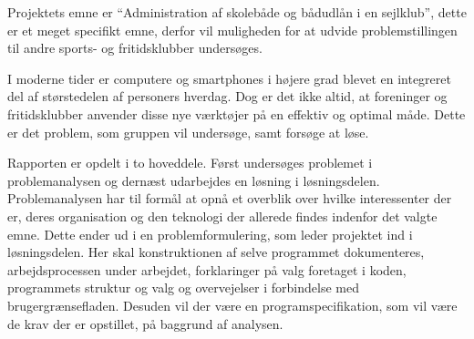 Projektets emne er ``Administration af skolebåde og bådudlån i en sejlklub'', dette er et meget specifikt
emne, derfor vil  muligheden for at udvide problemstillingen til andre sports- og fritidsklubber undersøges.

I moderne tider er computere og smartphones i højere grad blevet en integreret del af størstedelen af
personers hverdag. \citep{dstSPogPC} Dog er det ikke altid, at foreninger og fritidsklubber anvender disse nye
værktøjer på en effektiv og optimal måde. Dette er det problem, som gruppen vil undersøge, samt forsøge at løse.

Rapporten er opdelt i to hoveddele. Først undersøges problemet i problemanalysen og dernæst udarbejdes en
løsning i løsningsdelen. Problemanalysen har til formål at opnå et overblik over hvilke interessenter der er,
deres organisation og den teknologi der allerede findes indenfor det valgte emne. Dette ender ud i en problemformulering, som leder
projektet ind i løsningsdelen. Her skal konstruktionen af selve programmet dokumenteres, arbejdsprocessen under arbejdet, forklaringer på valg foretaget i koden, programmets struktur og valg og overvejelser i forbindelse med brugergrænsefladen. Desuden vil der være en
programspecifikation, som vil være de krav der er opstillet, på baggrund af analysen. 
